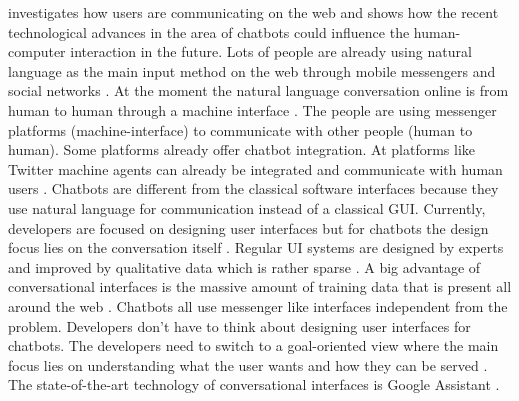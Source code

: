 
\citet{folstad2017chatbots} investigates how users are communicating on the web and shows how 
the recent technological advances in the area of chatbots could influence the human-computer interaction in the future.
Lots of people are already using natural language as the main input method on the web through mobile messengers 
and social networks \cite{folstad2017chatbots}. 
At the moment the natural language conversation online is from human to human through a machine interface \cite{folstad2017chatbots}.
The people are using messenger platforms (machine-interface) to communicate with other people (human to human).
Some platforms already offer chatbot integration. 
At platforms like Twitter machine agents can already be integrated and communicate with human users \cite{folstad2017chatbots}. 
Chatbots are different from the classical software interfaces because they use natural language 
for communication instead of a classical GUI.
Currently, developers are focused on designing user interfaces but for chatbots the design focus 
lies on the conversation itself \cite{folstad2017chatbots}. 
Regular UI systems are designed by experts and improved by qualitative data which is rather sparse \cite{folstad2017chatbots}.
A big advantage of conversational interfaces is the massive amount of training data that is present all around the web \cite{folstad2017chatbots}. 
Chatbots all use messenger like interfaces independent from the problem.
Developers don't have to think about designing user interfaces for chatbots.
The developers need to switch to a goal-oriented view where the main focus 
lies on understanding what the user wants and how they can be served \cite{folstad2017chatbots}.
The state-of-the-art technology of conversational interfaces is Google Assistant \cite{folstad2017chatbots}.

